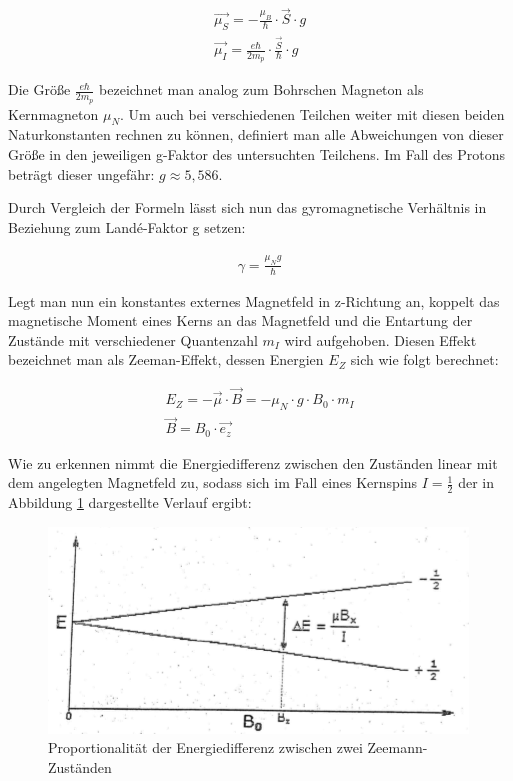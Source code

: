 \begin{align}
\overrightarrow{\mu_S}=-\frac{\mu_B}{\hbar}\cdot \overrightarrow{S}\cdot g \\
\overrightarrow{\mu_I}=\frac{e\hbar}{2m_p}\cdot \frac{\overrightarrow{S}}{\hbar}\cdot g 
\end{align}

Die Größe $\frac{e\hbar}{2m_p}$ bezeichnet man analog zum Bohrschen Magneton als Kernmagneton $\mu_N$. Um auch bei verschiedenen Teilchen weiter mit diesen beiden Naturkonstanten rechnen zu können, definiert man alle Abweichungen von dieser Größe in den jeweiligen g-Faktor des untersuchten Teilchens. Im Fall des Protons beträgt dieser ungefähr: $g \approx 5,586$.

Durch Vergleich der Formeln lässt sich nun das gyromagnetische Verhältnis in Beziehung zum Landé-Faktor g setzen:

\begin{align}
\gamma = \frac{\mu_N g}{\hbar}
\end{align}

Legt man nun ein konstantes externes Magnetfeld in z-Richtung an, koppelt das magnetische Moment eines Kerns an das Magnetfeld und die Entartung der Zustände mit verschiedener Quantenzahl $m_I$ wird aufgehoben. Diesen Effekt bezeichnet man als Zeeman-Effekt, dessen Energien $E_Z$ sich wie folgt berechnet:

\begin{align}
E_Z = -\overrightarrow{\mu}\cdot\overrightarrow{B}=-\mu_N \cdot g \cdot B_0 \cdot m_I \\
\overrightarrow{B}=B_0\cdot \overrightarrow{e_z}
\end{align}

Wie zu erkennen nimmt die Energiedifferenz zwischen den Zuständen linear mit dem angelegten Magnetfeld zu, sodass sich im Fall eines Kernspins $I=\frac{1}{2}$ der in Abbildung \ref{prop} dargestellte Verlauf ergibt:

\begin{figure}[htbp] 
     \includegraphics{Aufspaltung.png}
  \caption{Proportionalität der Energiedifferenz zwischen zwei Zeemann-Zuständen}
  \label{prop}
\end{figure}

